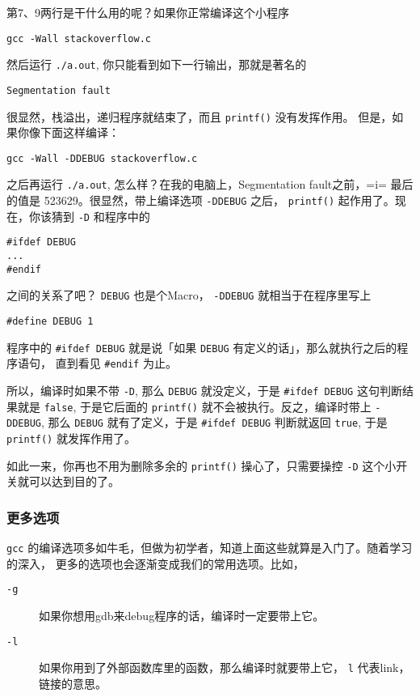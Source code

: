 \documentclass{wx672article}
\begin{document}
第7、9两行是干什么用的呢？如果你正常编译这个小程序
\begin{verbatim}
gcc -Wall stackoverflow.c
\end{verbatim}
然后运行 \texttt{./a.out}, 你只能看到如下一行输出，那就是著名的
\begin{verbatim}
Segmentation fault
\end{verbatim}
很显然，栈溢出，递归程序就结束了，而且 \texttt{printf()} 没有发挥作用。
但是，如果你像下面这样编译：
\begin{verbatim}
gcc -Wall -DDEBUG stackoverflow.c
\end{verbatim}
之后再运行 \texttt{./a.out}, 怎么样？在我的电脑上，Segmentation fault之前，=i= 最后的值是
523629。很显然，带上编译选项 \texttt{-DDEBUG} 之后， \texttt{printf()} 起作用了。现在，你该猜到
\texttt{-D} 和程序中的
\begin{verbatim}
#ifdef DEBUG
...
#endif
\end{verbatim}
之间的关系了吧？ \texttt{DEBUG} 也是个Macro， \texttt{-DDEBUG} 就相当于在程序里写上
\begin{verbatim}
#define DEBUG 1
\end{verbatim}
程序中的 \texttt{\#ifdef DEBUG} 就是说「如果 \texttt{DEBUG} 有定义的话」，那么就执行之后的程序语句，
直到看见 \texttt{\#endif} 为止。

所以，编译时如果不带 \texttt{-D}, 那么 \texttt{DEBUG} 就没定义，于是 \texttt{\#ifdef DEBUG}
这句判断结果就是 \texttt{false}, 于是它后面的 \texttt{printf()} 就不会被执行。反之，编译时带上 \texttt{-DDEBUG},
那么 \texttt{DEBUG} 就有了定义，于是 \texttt{\#ifdef DEBUG} 判断就返回 \texttt{true}, 于是 \texttt{printf()}
就发挥作用了。

如此一来，你再也不用为删除多余的 \texttt{printf()} 操心了，只需要操控 \texttt{-D}
这个小开关就可以达到目的了。

\subsubsection{更多选项}
\label{sec-2-2-4}
\texttt{gcc} 的编译选项多如牛毛，但做为初学者，知道上面这些就算是入门了。随着学习的深入，
更多的选项也会逐渐变成我们的常用选项。比如，
\begin{description}
\item[{\texttt{-g}}] 如果你想用gdb来debug程序的话，编译时一定要带上它。
\item[{\texttt{-l}}] 如果你用到了外部函数库里的函数，那么编译时就要带上它， \texttt{l} 代表link，
链接的意思。
\end{description}
\end{document}
